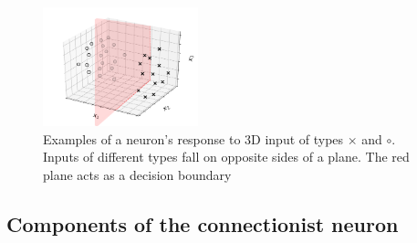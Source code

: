 \begin{frame}

\begin{figure}[ht]
     \centering
	\includegraphics[width=0.4\textwidth]{img/neuron_3d_grid}
	\caption{Examples of a neuron's response to 3D input of types $\times$ and $\circ$. Inputs of different types fall on opposite sides of a plane. The red plane acts as a decision boundary}
	\label{fig:neuron_3d_grid} 
\end{figure}
\end{frame}

\subsection{Components of the connectionist neuron}
    
